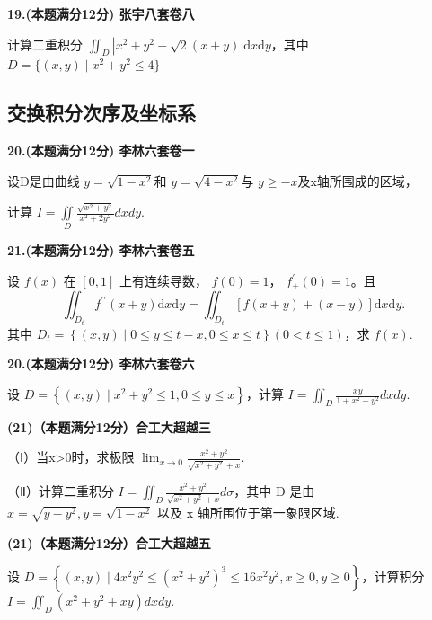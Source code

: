 \documentclass[a4paper,12pt]{article}
\begin{document}
\vspace{0.5cm}

\textbf{19.(本题满分12分) 张宇八套卷八}

计算二重积分 $\iint_{D}\left|x^{2}+y^{2}-\sqrt{2}(x+y)\right|\mathrm{d}x\mathrm{d}y$，其中 $D=\{(x,y)\mid x^{2}+y^{2}\leqslant4\}$

\subsection{交换积分次序及坐标系}

\textbf{20.(本题满分12分) 李林六套卷一}

设D是由曲线 $y=\sqrt{1-x^{2}}$和 $y=\sqrt{4-x^{2}}$与 $y\geq-x$及x轴所围成的区域，

计算 $I=\iint\limits_{D}\frac{\sqrt{x^{2}+y^{2}}}{x^{2}+2y^{2}}dx dy.$

\vspace{0.5cm}

\textbf{21.(本题满分12分) 李林六套卷五}

设 $f(x)$ 在 $[0,1]$ 上有连续导数， $f(0)=1$， $f_{+}^{\prime}(0)=1$。且
\[ \iint_{D_{t}}f^{\prime\prime}(x+y)\mathrm{d}x\mathrm{d}y=\iint_{D_{t}}\left[f(x+y)+(x-y)\right]\mathrm{d}x\mathrm{d}y. \]
其中 $D_{t}=\left\{(x,y)\mid0\leqslant y\leqslant t-x,0\leqslant x\leqslant t\right\}(0<t\leqslant1)$，求 $f(x)$.

\vspace{0.5cm}

\textbf{20.(本题满分12分) 李林六套卷六}

设 $D=\left\{(x,y)\mid x^{2}+y^{2}\leqslant1,0\leqslant y\leqslant x\right\}$，计算 $I=\iint_{D}\frac{xy}{1+x^{2}-y^{2}}dx dy.$

\vspace{0.5cm}

\textbf{(21)（本题满分12分）合工大超越三}

（Ⅰ）当x>0时，求极限 $\lim_{x\to0}\frac{x^{2}+y^{2}}{\sqrt{x^{2}+y^{2}}+x}$.

（Ⅱ）计算二重积分 $I=\iint_{D}\frac{x^{2}+y^{2}}{\sqrt{x^{2}+y^{2}}+x}d\sigma$，其中 D 是由 $x=\sqrt{y-y^{2}},y=\sqrt{1-x^{2}}$ 以及 x 轴所围位于第一象限区域.

\vspace{0.5cm}

\textbf{(21)（本题满分12分）合工大超越五}

设 $D=\left\{(x,y)\mid4x^{2}y^{2}\leqslant(x^{2}+y^{2})^{3}\leqslant16x^{2}y^{2},x\geqslant0,y\geqslant0\right\}$，计算积分 $I=\iint_{D}(x^{2}+y^{2}+xy)dxdy$.
\end{document}
